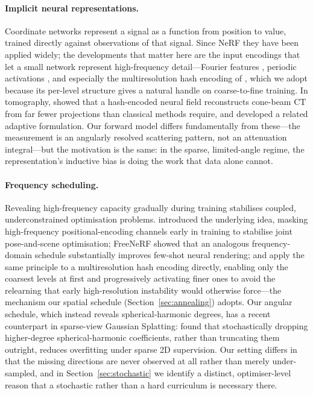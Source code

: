 \documentclass[11pt,a4paper]{article}
\begin{document}
\paragraph{Implicit neural representations.}
Coordinate networks represent a signal as a function from position to value, trained
directly against observations of that signal. Since NeRF \citep{Mildenhall2020} they have
been applied widely; the developments that matter here are the input encodings that let a
small network represent high-frequency detail---Fourier features
\citep{Tancik2020}, periodic activations \citep{Sitzmann2020}, and especially the
multiresolution hash encoding of \citet{Mueller2022}, which we adopt because its
per-level structure gives a natural handle on coarse-to-fine training. In tomography,
\citet{Zha2022} showed that a hash-encoded neural field reconstructs cone-beam CT from far
fewer projections than classical methods require, and \citet{Ruckert2022} developed a
related adaptive formulation. Our forward model differs fundamentally from these---the
measurement is an angularly resolved scattering pattern, not an attenuation
integral---but the motivation is the same: in the sparse, limited-angle regime, the
representation's inductive bias is doing the work that data alone cannot.

\paragraph{Frequency scheduling.}
Revealing high-frequency capacity gradually during training stabilises coupled,
underconstrained optimisation problems. \citet{Lin2021barf} introduced the underlying
idea, masking high-frequency positional-encoding channels early in training to stabilise
joint pose-and-scene optimisation; FreeNeRF \citep{Yang2023} showed that an analogous
frequency-domain schedule substantially improves few-shot neural rendering; and
\citet{Li2023neuralangelo} apply the same principle to a multiresolution hash encoding
directly, enabling only the coarsest levels at first and progressively activating finer
ones to avoid the relearning that early high-resolution instability would otherwise
force---the mechanism our spatial schedule (Section~\ref{sec:annealing}) adopts. Our
angular schedule, which instead reveals spherical-harmonic degrees, has a recent
counterpart in sparse-view Gaussian Splatting: \citet{Fang2026dropansh} found that
stochastically dropping higher-degree spherical-harmonic coefficients, rather than
truncating them outright, reduces overfitting under sparse 2D supervision. Our setting
differs in that the missing directions are never observed at all rather than merely
under-sampled, and in Section~\ref{sec:stochastic} we identify a distinct,
optimiser-level reason that a stochastic rather than a hard curriculum is necessary
there.
\end{document}
